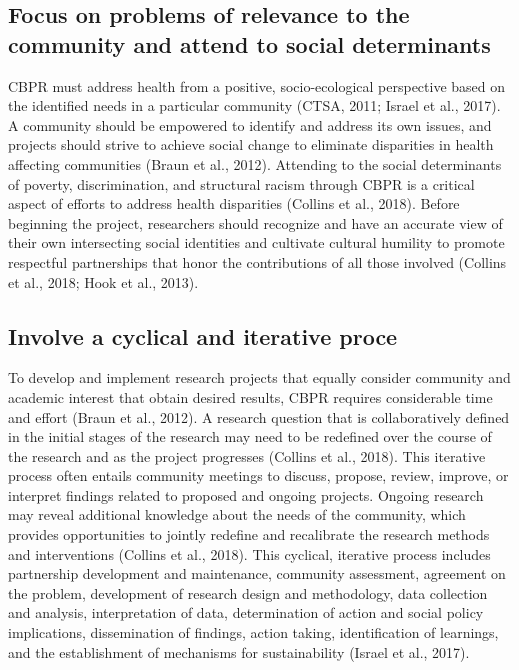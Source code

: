 \documentclass[
  11pt,
]{book}
\begin{document}
\hypertarget{focus-on-problems-of-relevance-to-the-community-and-attend-to-social-determinants}{%
\subsection{Focus on problems of relevance to the community and attend to social determinants}\label{focus-on-problems-of-relevance-to-the-community-and-attend-to-social-determinants}}

CBPR must address health from a positive, socio-ecological perspective based on the identified needs in a particular community (CTSA, 2011; Israel et al., 2017). A community should be empowered to identify and address its own issues, and projects should strive to achieve social change to eliminate disparities in health affecting communities (Braun et al., 2012). Attending to the social determinants of poverty, discrimination, and structural racism through CBPR is a critical aspect of efforts to address health disparities (Collins et al., 2018). Before beginning the project, researchers should recognize and have an accurate view of their own intersecting social identities and cultivate cultural humility to promote respectful partnerships that honor the contributions of all those involved (Collins et al., 2018; Hook et al., 2013).

\hypertarget{involve-a-cyclical-and-iterative-proce}{%
\subsection{Involve a cyclical and iterative proce}\label{involve-a-cyclical-and-iterative-proce}}

To develop and implement research projects that equally consider community and academic interest that obtain desired results, CBPR requires considerable time and effort (Braun et al., 2012). A research question that is collaboratively defined in the initial stages of the research may need to be redefined over the course of the research and as the project progresses (Collins et al., 2018). This iterative process often entails community meetings to discuss, propose, review, improve, or interpret findings related to proposed and ongoing projects. Ongoing research may reveal additional knowledge about the needs of the community, which provides opportunities to jointly redefine and recalibrate the research methods and interventions (Collins et al., 2018). This cyclical, iterative process includes partnership development and maintenance, community assessment, agreement on the problem, development of research design and methodology, data collection and analysis, interpretation of data, determination of action and social policy implications, dissemination of findings, action taking, identification of learnings, and the establishment of mechanisms for sustainability (Israel et al., 2017).
\end{document}
